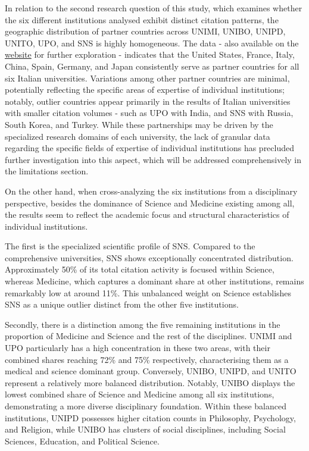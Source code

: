 \documentclass[year=2026]{cup-journal}
\begin{document}
In relation to the second research question of this study, which examines whether the six different institutions analysed exhibit distinct citation patterns, the geographic distribution of partner countries across UNIMI, UNIBO, UNIPD, UNITO, UPO, and SNS is highly homogeneous. The data - also available on the \href{https://open-sci.github.io/2025-2026/}{website} for further exploration - indicates that the United States, France, Italy, China, Spain, Germany, and Japan consistently serve as partner countries for all six Italian universities. Variations among other partner countries are minimal, potentially reflecting the specific areas of expertise of individual institutions; notably, outlier countries appear primarily in the results of Italian universities with smaller citation volumes - such as UPO with India, and SNS with Russia, South Korea, and Turkey. While these partnerships may be driven by the specialized research domains of each university, the lack of granular data regarding the specific fields of expertise of individual institutions has precluded further investigation into this aspect, which will be addressed comprehensively in the limitations section.

On the other hand, when cross-analyzing the six institutions from a disciplinary perspective, besides the dominance of Science and Medicine existing among all, the results seem to reflect the academic focus and structural characteristics of individual institutions. 

The first is the specialized scientific profile of SNS. Compared to the comprehensive universities, SNS shows exceptionally concentrated distribution. Approximately 50\% of its total citation activity is focused within Science, whereas Medicine, which captures a dominant share at other institutions, remains remarkably low at around 11\%. This unbalanced weight on Science establishes SNS as a unique outlier distinct from the other five institutions.

Secondly, there is a distinction among the five remaining institutions in the proportion of Medicine and Science and the rest of the disciplines. UNIMI and UPO particularly has a high concentration in these two areas, with their combined shares reaching 72\% and 75\% respectively, characterising them as a medical and science dominant group. Conversely, UNIBO, UNIPD, and UNITO represent a relatively more balanced distribution. Notably, UNIBO displays the lowest combined share of Science and Medicine among all six institutions, demonstrating a more diverse disciplinary foundation. Within these balanced institutions, UNIPD possesses higher citation counts in Philosophy, Psychology, and Religion, while UNIBO has clusters of social disciplines, including Social Sciences, Education, and Political Science.
\end{document}
